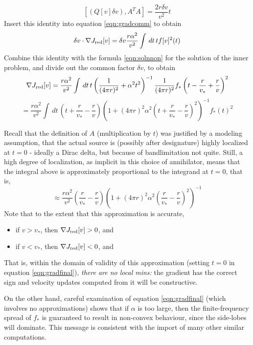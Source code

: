 \begin{equation}
\label{eqn:comm3}
[(Q[v]\delta v),A^TA]=\frac{2r\delta v}{v^2}t
\end{equation}
Insert this identity into equation \ref{eqn:gradcomm} to obtain
\begin{equation}
\label{eqn:comm4}
\delta v \cdot \nabla J_{\rm red}[v] =  \delta v\frac{r \alpha^2}{v^2}\int \,dt\,tf[v]^2(t)
\end{equation}
Combine this identity with the formula \ref{eqn:solnnon} for the solution of the inner problem, and divide out the common factor $\delta v$, to obtain
\[
\nabla J_{\rm red}[v] = \frac{r\alpha^2}{v^2}\int \,dt\,t\left(\frac{1}{(4\pi r)^2} + \alpha^2 t^2\right)^{-1}\frac{1}{(4\pi r)^2}f_*\left(t-\frac{r}{v_*}+\frac{r}{v}\right)^2
\]
\begin{equation}
\label{eqn:gradfinal}
= \frac{r\alpha^2}{v^2}\int \,dt\,\left(t+\frac{r}{v_*}-\frac{r}{v}\right)\left(1 + (4\pi r)^2\alpha^2 \left(t+\frac{r}{v_*}-\frac{r}{v}\right)^2\right)^{-1}f_*(t)^2
\end{equation}

Recall that the definition of $A$ (multiplication by $t$) was justified by a modeling assumption, that the actual source is (possibly after designature) highly localized at $t=0$ - ideally a Dirac delta, but because of bandlimitation not quite. Still, a high degree of localization, as implicit in this choice of annihilator, means that the integral above is approximately proportional to the integrand at $t=0$, that is, 
\[
\approx \frac{r\alpha^2}{v^2}\left(\frac{r}{v_*}-\frac{r}{v}\right)\left(1 + (4\pi r)^2\alpha^2 \left(\frac{r}{v_*}-\frac{r}{v}\right)^2\right)^{-1}
\]
Note that to the extent that this approximation is accurate,
\begin{itemize}
\item if $v > v_*$, then $\nabla J_{\rm red}[v] > 0$, and
\item if $v < v_*$, then $\nabla J_{\rm red}[v] < 0$, and
\end{itemize}
That is, within the domain of validity of this approximation (setting $t=0$ in equation \ref{eqn:gradfinal}), {\em there are no local mins:} the gradient has the correct sign and velocity updates computed from it will be constructive.

On the other hand, careful examination of equation \ref{eqn:gradfinal} (which involves no approximations) shows that if $\alpha$ is too large, then the finite-frequency spread of $f_*$ is guaranteed to result in non-convex behaviour, since the side-lobes will dominate. This message is consistent with the import of many other similar computations.

